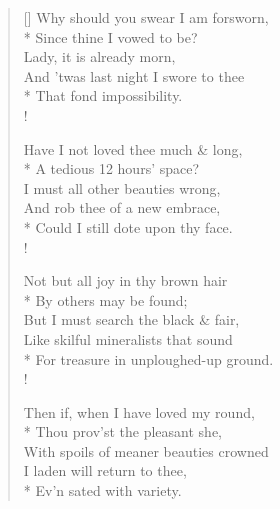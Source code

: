 \documentclass[MAIN]{subfiles}
\begin{document}
\settowidth{\versewidth}{And 'twas last night I swore to thee}
\begin{verse}[\versewidth]
Why should you swear I am forsworn,\\*
\vin Since thine I vowed to be?\\
Lady, it is already morn,\\
\vin And 'twas last night I swore to thee\\*
\vin That fond impossibility.\\!

Have I not loved thee much \& long,\\*
\vin A tedious 12 hours' space?\\
I must all other beauties wrong,\\
\vin And rob thee of a new embrace,\\*
\vin Could I still dote upon thy face.\\!

Not but all joy in thy brown hair\\*
\vin By others may be found;\\
But I must search the black \& fair,\\
\vin Like skilful mineralists that sound\\*
\vin For treasure in unploughed-up ground.\\!

Then if, when I have loved my round,\\*
\vin Thou prov'st the pleasant she,\\
With spoils of meaner beauties crowned\\
\vin I laden will return to thee,\\*
\vin Ev'n sated with variety.
\end{verse}
\end{document}
